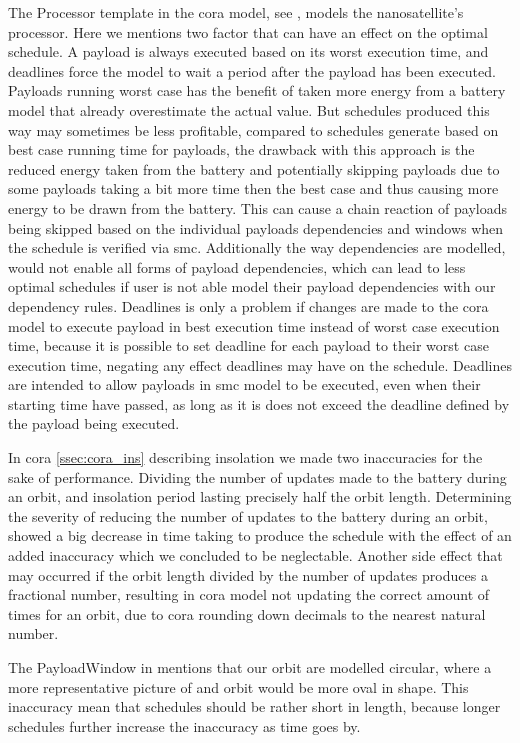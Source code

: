 The Processor template in the \gls{cora} model, see , models the nanosatellite's processor. Here we mentions two factor that can have an effect on the optimal schedule. A payload is always executed based on its worst execution time, and deadlines force the model to wait a period after the payload has been executed. Payloads running worst case has the benefit of taken more energy from a battery model that already overestimate the actual value. But schedules produced this way may sometimes be less profitable, compared to schedules generate based on best case running time for payloads, the drawback with this approach is the reduced energy taken from the battery and potentially skipping payloads due to some payloads taking a bit more time then the best case and thus causing more energy to be drawn from the battery. This can cause a chain reaction of payloads being skipped based on the individual payloads dependencies and windows when the schedule is verified via \gls{smc}. Additionally the way dependencies are modelled, would not enable all forms of payload dependencies, which can lead to less optimal schedules if user is not able model their payload dependencies with our dependency rules.
Deadlines is only a problem if changes are made to the \gls{cora} model to execute payload in best execution time instead of worst case execution time, because it is possible to set deadline for each payload to their worst case execution time, negating any effect deadlines may have on the schedule. Deadlines are intended to allow payloads in \gls{smc} model to be executed, even when their starting time have passed, as long as it is does not exceed the deadline defined by the payload being executed.

In \gls{cora} \cref{ssec:cora_ins} describing insolation we made two inaccuracies for the sake of performance.  Dividing the number of updates made to the battery during an orbit, and insolation period lasting precisely half the orbit length. Determining the severity of reducing the number of updates to the battery during an orbit, showed a big decrease in time taking to produce the schedule with the effect of an added inaccuracy which we concluded to be neglectable. Another side effect that may occurred  if the orbit length divided by the number of updates produces a fractional number, resulting in \gls{cora} model not updating the correct amount of times for an orbit, due to \gls{cora} rounding down decimals to the nearest natural number.

The PayloadWindow in  mentions that our orbit are modelled circular, where a more representative picture of and orbit would be more oval in shape. This inaccuracy mean that schedules should be rather short in length, because longer schedules further increase the inaccuracy as time goes by.

